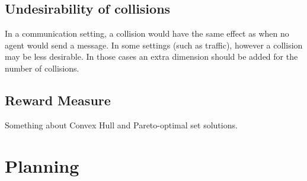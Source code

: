 \documentclass{article}
\begin{document}
		\subsection{Undesirability of collisions}
		\label{sub:undesirability_of_collisions}
		In a communication setting, a collision would have the same effect as
		when no agent would send a message. In some settings (such as traffic),
		however a collision may be less desirable. In those cases an extra
		dimension should be added for the number of collisions.

		\subsection{Reward Measure}
		\label{sub:reward_measure}
		Something about Convex Hull and Pareto-optimal set solutions.

	\section{Planning}
	\label{sec:planning}


	
	
\end{document}
